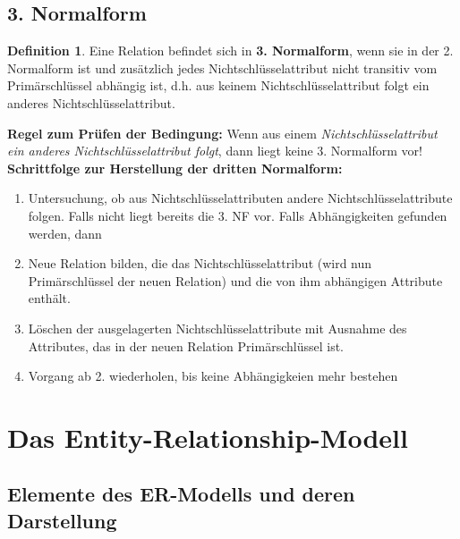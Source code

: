 \documentclass[a4paper,10pt,DIV9, BCOR12mm, oneside,openright,openbib]{scrreprt}
\theoremstyle{definition}
\newtheorem{mydef}{Definition}[section]
\theoremstyle{plain}
\begin{document}
  \subsection{3. Normalform}
  \begin{mydef}
   Eine Relation befindet sich in \textbf{3. Normalform}, wenn sie in der 2. Normalform ist und zusätzlich jedes Nichtschlüsselattribut nicht transitiv vom Primärschlüssel abhängig ist, d.h. aus keinem Nichtschlüsselattribut folgt ein anderes Nichtschlüsselattribut. 
  \end{mydef}
  \textbf{Regel zum Prüfen der Bedingung:} Wenn aus einem \textit{Nichtschlüsselattribut ein anderes Nichtschlüsselattribut folgt}, dann liegt keine 3. Normalform vor! \\
  \textbf{Schrittfolge zur Herstellung der dritten Normalform:}
    \begin{enumerate}
      \item Untersuchung, ob aus Nichtschlüsselattributen andere Nichtschlüsselattribute folgen. Falls nicht liegt bereits die 3. NF vor. Falls Abhängigkeiten gefunden werden, dann 
      \item Neue Relation bilden, die das Nichtschlüsselattribut (wird nun Primärschlüssel der neuen Relation) und die von ihm abhängigen Attribute enthält.
      \item Löschen der ausgelagerten Nichtschlüsselattribute mit Ausnahme des Attributes, das in der neuen Relation Primärschlüssel ist.
      \item Vorgang ab 2. wiederholen, bis keine Abhängigkeien mehr bestehen
    \end{enumerate}

  
  
 \section{Das Entity-Relationship-Modell}
 \subsection{Elemente des ER-Modells und deren Darstellung}
\end{document}
